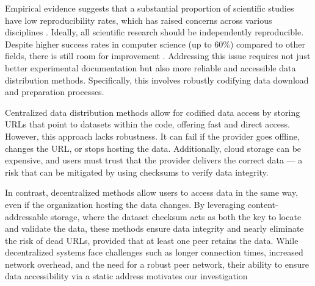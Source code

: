 \documentclass{article}
\begin{document}




Empirical evidence suggests that a substantial proportion of scientific studies have low reproducibility
  rates, which has raised concerns across various disciplines \cite{baker_reproducibility_2016}.
Ideally, all scientific research should be independently reproducible.
Despite higher success rates in computer science (up to 60\%) compared to other fields, there is still room for improvement
\cite{NEURIPS2019_c429429b, collberg2016repeatability, desai_what_2024}.
Addressing this issue requires not just better experimental documentation but also more reliable and
  accessible data distribution methods.
Specifically, this involves robustly codifying data download and preparation processes.


Centralized data distribution methods allow for codified data access by storing URLs that point to datasets
  within the code, offering fast and direct access.
However, this approach lacks robustness.
It can fail if the provider goes offline, changes the URL, or stops hosting the data.
Additionally, cloud storage can be expensive, and users must trust that the provider delivers the correct
  data --- a risk that can be mitigated by using checksums to verify data integrity.

In contrast, decentralized methods allow users to access data in the same way, even if the organization
  hosting the data changes.
By leveraging content-addressable storage, where the dataset checksum acts as both the key to locate and
  validate the data, these methods ensure data integrity and nearly eliminate the risk of dead URLs, provided
  that at least one peer retains the data.
While decentralized systems face challenges such as longer connection times, increased network overhead, and
  the need for a robust peer network, their ability to ensure data accessibility via a static address
  motivates our investigation
\end{document}

